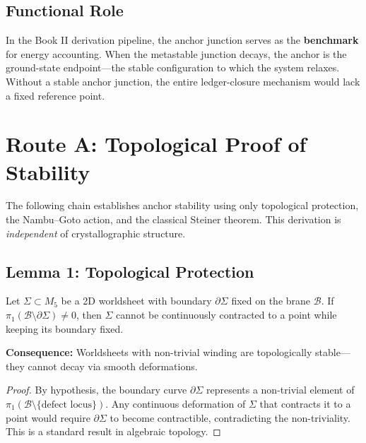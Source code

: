\subsection{Functional Role}

In the Book II derivation pipeline, the anchor junction serves as the \textbf{benchmark}
for energy accounting. When the metastable junction decays, the anchor is the ground-state
endpoint---the stable configuration to which the system relaxes. Without a stable
anchor junction, the entire ledger-closure mechanism would lack a fixed reference point.

\section{Route A: Topological Proof of Stability}
\label{sec:anchor:routeA}


The following chain establishes anchor stability using only topological protection,
the Nambu--Goto action, and the classical Steiner theorem. This derivation is
\emph{independent} of crystallographic structure.

\subsection{Lemma 1: Topological Protection}

\begin{derivationbox}[title=Lemma 1: Topological Protection of Worldsheets]
    Let $\Sigma \subset M_5$ be a 2D worldsheet with boundary $\partial\Sigma$
    fixed on the brane $\mathcal{B}$. If $\pi_1(\mathcal{B} \setminus \partial\Sigma) \neq 0$,
    then $\Sigma$ cannot be continuously contracted to a point while keeping its
    boundary fixed.

    \textbf{Consequence:} Worldsheets with non-trivial winding are topologically
    stable---they cannot decay via smooth deformations. \tagDer
\end{derivationbox}

\begin{proof}
By hypothesis, the boundary curve $\partial\Sigma$ represents a non-trivial element
of $\pi_1(\mathcal{B} \setminus \{\text{defect locus}\})$. Any continuous deformation
of $\Sigma$ that contracts it to a point would require $\partial\Sigma$ to become
contractible, contradicting the non-triviality. This is a standard result in algebraic
topology.
\end{proof}

